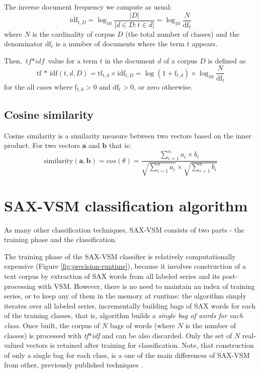 \documentclass{llncs}
\begin{document}
The inverse document frequency we compute as usual:
\begin{equation}
 \mbox{idf}_{t, D} =  \log_{10}\frac{|D|}{|d \in D : t \in d|} = \log_{10}\frac{N}{\mbox{df}_{t}}
\end{equation} 
where $N$ is the cardinality of corpus $D$ (the total number of classes) and the 
denominator $\mbox{df}_{t}$ is a number of documents where the term $t$ appears.

Then, $\textit{tf$\ast$idf}$ value for a term $t$ in the document $d$ of a corpus $D$ is defined as 
\begin{equation}
 \mbox{tf * idf}(t, d, D) =  \mbox{tf}_{t, d} \times \mbox{idf}_{t, D} = \log(1 + \mbox{f}_{t,d})
\times \log_{10}\frac{N}{\mbox{df}_{t}}
 \label{formula:tfidf}
\end{equation} 
for the all cases where $\mbox{f}_{t,d}>0$ and $\mbox{df}_{t}>0$, or zero otherwise.

\subsection{Cosine similarity}
Cosine similarity is a similarity measure between two vectors based on the inner product. 
For two vectors $\boldsymbol{a}$ and $\boldsymbol{b}$ that is:
\begin{equation}
 \mbox{similarity}(\boldsymbol{a},\boldsymbol{b}) = cos(\theta) = \frac{ \sum\limits^{n}_{i=1} a_{i}
\times b_{i} }{
\sqrt{\sum\limits^{n}_{i=1} a_{i}} \times \sqrt{\sum\limits^{n}_{i=1} b_{i}} }
\end{equation} 


\section{SAX-VSM classification algorithm }
As many other classification techniques, SAX-VSM consists of two parts - the training phase 
and the classification. 

The training phase of the SAX-VSM classifier is relatively computationally expensive 
(Figure \ref{fig:precision-runtime}), because it involves construction of a text corpus by
extraction 
of SAX words from all labeled series and its post-processing with VSM. However, there is no need 
to maintain an index of training series, or to keep any of them in the memory at runtime:
the algorithm simply iterates over all labeled series, incrementally building bags of SAX words for
each of the training classes, that is, algorithm builds a \textit{single bag of words for each
class}. Once built, the corpus of $N$ bags of words (where $N$ is the number of classes) is
processed with \textit{tf$\ast$idf} and can be also discarded. Only the set of $N$ real-valued
vectors is retained after training for classification. Note, that construction of only a single bag
for
each class, is a one of the main differences of SAX-VSM from other, previously published 
techniques \cite{bag_patterns}.
\end{document}

